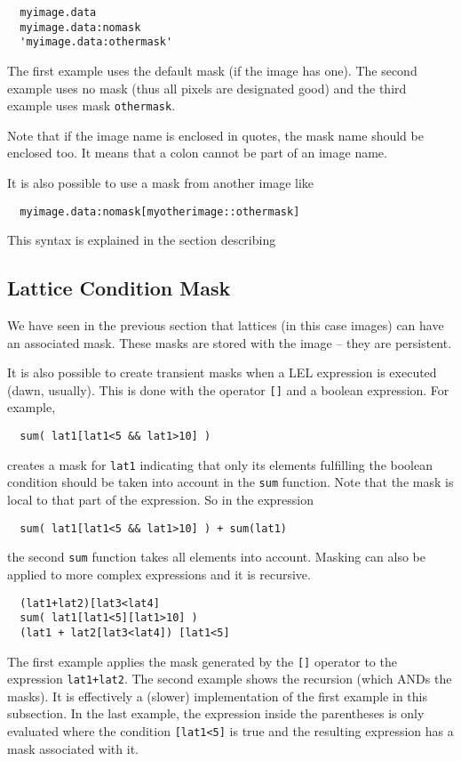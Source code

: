\begin{verbatim}
  myimage.data
  myimage.data:nomask
  'myimage.data:othermask'
\end{verbatim}

\medskip\noindent
The first example uses the default mask (if the image has one).
The second example uses no mask (thus all pixels are designated good)
and the third example uses mask \texttt{othermask}.

\medskip\noindent
Note that if the image name is enclosed in quotes, the mask name
should be enclosed too. It means that a colon cannot be part of
an image name.

\medskip\noindent
It is also possible to use a mask from another image like
\begin{verbatim}
  myimage.data:nomask[myotherimage::othermask]
\end{verbatim}
This syntax is explained in the section describing


\subsection{\label{LEL:CONDITIONS}Lattice Condition Mask}

We have seen in the previous section that lattices (in this case images)
can have an associated mask.  These masks are stored with the image --
they are persistent.  

\medskip\noindent It is also possible to create transient masks when a LEL expression is
executed (dawn, usually).  This is done with the operator \texttt{[]}
and a boolean expression.  For example,

\begin{verbatim}
  sum( lat1[lat1<5 && lat1>10] )
\end{verbatim}
creates a mask for {\tt lat1} indicating that only its elements fulfilling
the boolean condition should be taken into account in the \texttt{sum}
function.  Note that the mask is local to that part of the expression. So in
the expression

\begin{verbatim}
  sum( lat1[lat1<5 && lat1>10] ) + sum(lat1)
\end{verbatim}
the second \texttt{sum} function takes all elements into account.
Masking can also be applied to more complex expressions and it is recursive.

\begin{verbatim}
  (lat1+lat2)[lat3<lat4]
  sum( lat1[lat1<5][lat1>10] )
  (lat1 + lat2[lat3<lat4]) [lat1<5]
\end{verbatim}
The first example applies the mask generated by the \texttt{[]}
operator to the expression \texttt{lat1+lat2}.  The second example shows
the recursion (which ANDs the masks).  It is effectively a (slower)
implementation of the first example in this subsection.  In the last
example, the expression inside the parentheses is only evaluated
where the condition {\tt [lat1<5]} is true and the resulting expression
has a mask associated with it.  


